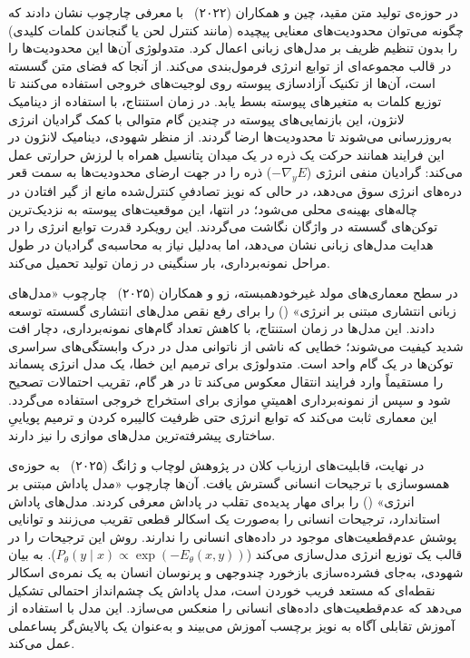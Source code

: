 در حوزه‌ی تولید متن مقید، چین و همکاران (۲۰۲۲)~\cite{qin2022cold} با معرفی چارچوب  نشان دادند که چگونه می‌توان محدودیت‌های معنایی پیچیده (مانند کنترل لحن یا گنجاندن کلمات کلیدی) را بدون تنظیم ظریف بر مدل‌های زبانی اعمال کرد. متدولوژی آن‌ها این محدودیت‌ها را در قالب مجموعه‌ای از توابع انرژی فرمول‌بندی می‌کند. از آنجا که فضای متن گسسته است، آن‌ها از تکنیک آزادسازی پیوسته روی لوجیت‌های خروجی استفاده می‌کنند تا توزیع کلمات به متغیرهای پیوسته بسط یابد. در زمان استنتاج، با استفاده از دینامیک لانژون، این بازنمایی‌های پیوسته در چندین گام متوالی با کمک گرادیان انرژی به‌روزرسانی می‌شوند تا محدودیت‌ها ارضا گردند. از منظر شهودی، دینامیک لانژون در این فرایند همانند حرکت یک ذره در یک میدان پتانسیل همراه با لرزش حرارتی عمل می‌کند: گرادیان منفی انرژی ($-\nabla_y E$) ذره را در جهت ارضای محدودیت‌ها به سمت قعر دره‌های انرژی سوق می‌دهد، در حالی که نویز تصادفیِ کنترل‌شده مانع از گیر افتادن در چاله‌های بهینه‌ی محلی می‌شود؛ در انتها، این موقعیت‌های پیوسته به نزدیک‌ترین توکن‌های گسسته در واژگان نگاشت می‌گردند. این رویکرد قدرت توابع انرژی را در هدایت مدل‌های زبانی نشان می‌دهد، اما به‌دلیل نیاز به محاسبه‌ی گرادیان در طول مراحل نمونه‌برداری، بار سنگینی در زمان تولید تحمیل می‌کند.

در سطح معماری‌های مولد غیرخودهمبسته، زو و همکاران (۲۰۲۵)~\cite{xu2025energybased} چارچوب «مدل‌های زبانی انتشاری مبتنی بر انرژی» () را برای رفع نقص مدل‌های انتشاری گسسته توسعه دادند. این مدل‌ها در زمان استنتاج، با کاهش تعداد گام‌های نمونه‌برداری، دچار افت شدید کیفیت می‌شوند؛ خطایی که ناشی از ناتوانی مدل در درک وابستگی‌های سراسری توکن‌ها در یک گام واحد است. متدولوژی  برای ترمیم این خطا، یک مدل انرژی پسماند را مستقیماً وارد فرایند انتقال معکوس می‌کند تا در هر گام، تقریب احتمالات تصحیح شود و سپس از نمونه‌برداری اهمیتیِ موازی برای استخراج خروجی استفاده می‌گردد. این معماری ثابت می‌کند که توابع انرژی حتی ظرفیت کالیبره کردن و ترمیم پویاییِ ساختاری پیشرفته‌ترین مدل‌های موازی را نیز دارند.

در نهایت، قابلیت‌های ارزیاب کلان در پژوهش لوچاب و ژانگ (۲۰۲۵)~\cite{lochab2025energybased} به حوزه‌ی همسوسازی با ترجیحات انسانی گسترش یافت. آن‌ها چارچوب «مدل پاداش مبتنی بر انرژی» () را برای مهار پدیده‌ی تقلب در پاداش معرفی کردند. مدل‌های پاداش استاندارد، ترجیحات انسانی را به‌صورت یک اسکالر قطعی تقریب می‌زنند و توانایی پوشش عدم‌قطعیت‌های موجود در داده‌های انسانی را ندارند. روش  این ترجیحات را در قالب یک توزیع انرژی مدل‌سازی می‌کند ($P_\theta(y \mid x) \propto \exp(-E_\theta(x, y))$). به بیان شهودی، به‌جای فشرده‌سازی بازخورد چندوجهی و پرنوسان انسان به یک نمره‌ی اسکالر نقطه‌ای که مستعد فریب خوردن است، مدل پاداش یک چشم‌انداز احتمالی تشکیل می‌دهد که عدم‌قطعیت‌های داده‌های انسانی را منعکس می‌سازد. این مدل با استفاده از آموزش تقابلی آگاه به نویز برچسب آموزش می‌بیند و به‌عنوان یک پالایش‌گر پساعملی عمل می‌کند.

